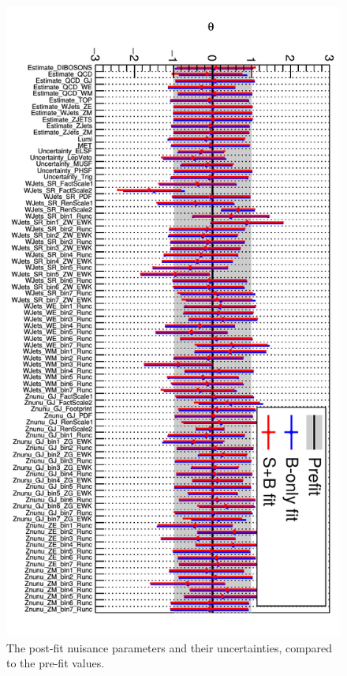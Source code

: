 \begin{figure}[p]
  \centering
 \includegraphics[width=.8\textwidth]{nuisance.png} 
 \caption{The post-fit nuisance parameters and their uncertainties, compared to the pre-fit values.}
 \label{fig:nuisance}
\end{figure}


